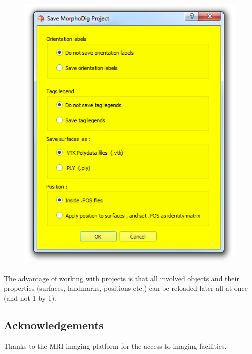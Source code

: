 \documentclass[12pt, a4paper]{book}
\begin{document}
\begin{figure}
  \centering  
 \includegraphics[scale=0.5]{../images/07/project/save_ntw.png}
\label{save_project_file}
\end{figure}

The advantage of working with projects is that all involved objects and their properties (surfaces, landmarks, positions etc.) can be reloaded later all at once (and not 1 by 1). 

\subsection{Acknowledgements}
Thanks to the MRI imaging platform for the access to imaging facilities.



%  		
\end{document}
